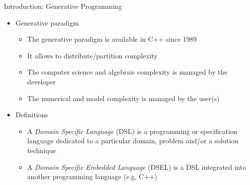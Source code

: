 \documentclass[final,utf8,,hyperref={pdfpagelabels=false}]{beamer}
\newcommand{\inputsnapshot}[1]{
  
}
\begin{document}
\begin{frame}[containsverbatim]{}
\begin{columns}[t]
    \begin{block}{Introduction: Generative Programming}
      \begin{itemize}
      \item Generative paradigm
        \begin{itemize}
        \item The generative paradigm is available in C++ since 1989
        \item It allows to  \alert{distribute/partition complexity}
        \item The computer science and algebraic complexity is managed by the \alert{developer}
        \item The numerical and model complexity is managed by the
          \alert{user(s)}
        \end{itemize}
      \item Definitions
        \begin{itemize}
        \item A \alert{\emph{Domain Specific Language} (DSL)} is a programming or specification language
          dedicated to a particular domain, problem and/or a solution technique
        \item A \alert{\emph{Domain Specific Embedded Language} (DSEL)}
          is a DSL integrated into another programming language (e.g. C++)
        \end{itemize}
      \end{itemize}
    \end{block}
    \vfill


\end{columns}
\end{frame}
\end{document}

